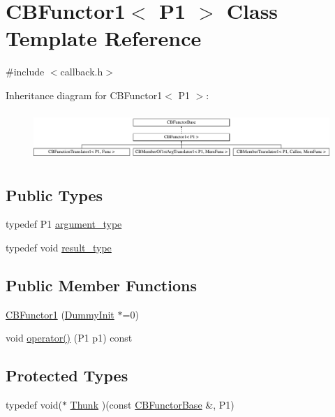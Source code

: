 \hypertarget{class_c_b_functor1}{\section{C\+B\+Functor1$<$ P1 $>$ Class Template Reference}
\label{class_c_b_functor1}
}


{\ttfamily \#include $<$callback.\+h$>$}

Inheritance diagram for C\+B\+Functor1$<$ P1 $>$\+:\begin{figure}[H]
\begin{center}
\leavevmode
\includegraphics[height=1.854305cm]{class_c_b_functor1}
\end{center}
\end{figure}
\subsection*{Public Types}
\begin{DoxyCompactItemize}
\item 
typedef P1 \hyperlink{class_c_b_functor1_ad53b976c17b95b8170f3597725821386}{argument\+\_\+type}
\item 
typedef void \hyperlink{class_c_b_functor1_a6803f5dfe59d2edeb3988b09b7d73b6e}{result\+\_\+type}
\end{DoxyCompactItemize}
\subsection*{Public Member Functions}
\begin{DoxyCompactItemize}
\item 
\hyperlink{class_c_b_functor1_a1049e24129fa3a59189422c69e236828}{C\+B\+Functor1} (\hyperlink{class_c_b_functor_base_1_1_dummy_init}{Dummy\+Init} $\ast$=0)
\item 
void \hyperlink{class_c_b_functor1_a0d9c9376cf5017cc26c96e7cb66adda1}{operator()} (P1 p1) const 
\end{DoxyCompactItemize}
\subsection*{Protected Types}
\begin{DoxyCompactItemize}
\item 
typedef void($\ast$ \hyperlink{class_c_b_functor1_a447200fb312ec0cf184fd5c96da59c5a}{Thunk} )(const \hyperlink{class_c_b_functor_base}{C\+B\+Functor\+Base} \&, P1)
\end{DoxyCompactItemize}
